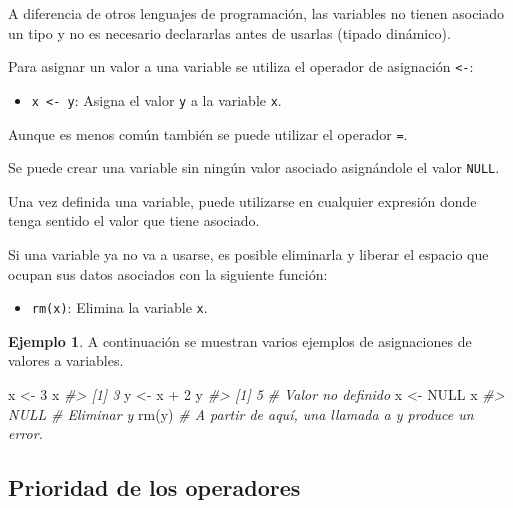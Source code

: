 \documentclass[
]{book}
\newenvironment{Shaded}{\begin{snugshade}}{\end{snugshade}}
\newcommand{\CommentTok}[1]{\textcolor[rgb]{0.56,0.35,0.01}{\textit{#1}}}
\newcommand{\ConstantTok}[1]{\textcolor[rgb]{0.00,0.00,0.00}{#1}}
\newcommand{\DecValTok}[1]{\textcolor[rgb]{0.00,0.00,0.81}{#1}}
\newcommand{\FunctionTok}[1]{\textcolor[rgb]{0.00,0.00,0.00}{#1}}
\newcommand{\NormalTok}[1]{#1}
\newcommand{\OtherTok}[1]{\textcolor[rgb]{0.56,0.35,0.01}{#1}}
\newcommand{\SpecialCharTok}[1]{\textcolor[rgb]{0.00,0.00,0.00}{#1}}
\providecommand{\tightlist}{%
  \setlength{\itemsep}{0pt}\setlength{\parskip}{0pt}}
\theoremstyle{definition}
\theoremstyle{definition}
\newtheorem{example}{Ejemplo}[chapter]
\theoremstyle{definition}
\theoremstyle{definition}
\theoremstyle{remark}
\begin{document}
A diferencia de otros lenguajes de programación, las variables no tienen asociado un tipo y no es necesario declararlas antes de usarlas (tipado dinámico).

Para asignar un valor a una variable se utiliza el operador de asignación \texttt{\textless{}-}:

\begin{itemize}
\tightlist
\item
  \texttt{x\ \textless{}-\ y}: Asigna el valor \texttt{y} a la variable \texttt{x}.
\end{itemize}

Aunque es menos común también se puede utilizar el operador \texttt{=}.

Se puede crear una variable sin ningún valor asociado asignándole el valor \texttt{NULL}.

Una vez definida una variable, puede utilizarse en cualquier expresión donde tenga sentido el valor que tiene asociado.

Si una variable ya no va a usarse, es posible eliminarla y liberar el espacio que ocupan sus datos asociados con la siguiente función:

\begin{itemize}
\tightlist
\item
  \texttt{rm(x)}: Elimina la variable \texttt{x}.
\end{itemize}

\begin{example}

A continuación se muestran varios ejemplos de asignaciones de valores a variables.

\begin{Shaded}
\begin{Highlighting}[]
\NormalTok{x }\OtherTok{\textless{}{-}} \DecValTok{3}
\NormalTok{x}
\CommentTok{\#\textgreater{} [1] 3}
\NormalTok{y }\OtherTok{\textless{}{-}}\NormalTok{ x }\SpecialCharTok{+} \DecValTok{2}
\NormalTok{y}
\CommentTok{\#\textgreater{} [1] 5}
\CommentTok{\# Valor no definido}
\NormalTok{x }\OtherTok{\textless{}{-}} \ConstantTok{NULL}
\NormalTok{x}
\CommentTok{\#\textgreater{} NULL}
\CommentTok{\# Eliminar y}
\FunctionTok{rm}\NormalTok{(y)}
\CommentTok{\# A partir de aquí, una llamada a y produce un error.}
\end{Highlighting}
\end{Shaded}

\end{example}

\hypertarget{prioridad-de-los-operadores}{%
\subsection{Prioridad de los operadores}\label{prioridad-de-los-operadores}}
\end{document}
